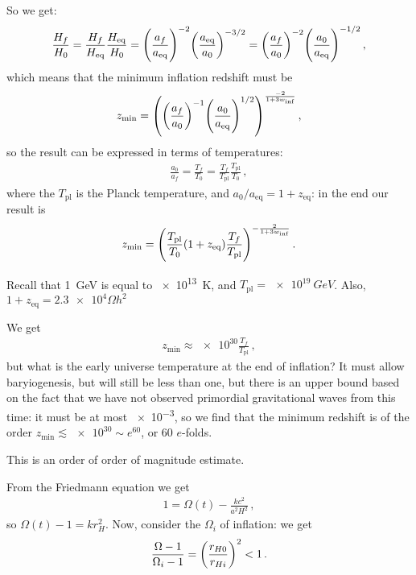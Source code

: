 \documentclass[main.tex]{subfiles}
\begin{document}
So we get: 
%
\begin{align}
  \frac{H_f}{H_0} 
  = \frac{H_f}{H _{\text{eq}}} \frac{H _{\text{eq}}}{H_0 } 
  = \qty(\frac{a_f}{a _{\text{eq}}})^{-2} \qty(\frac{a _{\text{eq}}}{a_0 })^{-3/2} 
  = \qty(\frac{a_f}{a_0 })^{-2} \qty(\frac{a_0}{a _{\text{eq}}})^{-1/2}
\,,
\end{align}
%
which means that the minimum inflation redshift must be 
%
\begin{align}
  z _{\text{min}} = \qty(\qty(\frac{a_f}{a_0 })^{-1} \qty(\frac{a_0 }{a _{\text{eq}}})^{1/2} )^{\frac{-2}{1 + 3 w _{\text{inf}}}}
\,,
\end{align}
%
so the result can be expressed in terms of temperatures: 
%
\begin{align}
  \frac{a_0}{a_f} = \frac{T_f}{T_0 } = \frac{T_f}{T _{\text{pl}}} \frac{T _{\text{pl}}}{T_0 }  
\,,
\end{align}
%
where the \(T _{\text{pl}}\) is the Planck temperature,
and \(a_0 / a _{\text{eq}} = 1 + z _{\text{eq}}\): in the end our result is 
%
\begin{align}
  z _{\text{min}} = \qty(\frac{T _{\text{pl}}}{T_0 } (1+ z _{\text{eq}}) \frac{T_f}{T _{\text{pl}}})^{- \frac{2}{1 + 3 w _{\text{inf}}}}
\,.
\end{align}
%

Recall that \SI{1}{GeV} is equal to \SI{e13}{K}, and \(T _{\text{pl}} = \SI{e19}{GeV}\).
Also, \(1 + z _{\text{eq}} = \num{2.3e4} \Omega h^2\) 


We get 
%
\begin{align}
  z _{\text{min}} \approx \num{e30} \frac{T_f}{T _{\text{pl}}}
\,,
\end{align}
%
but what is the early universe temperature at the end of inflation? It must allow baryiogenesis, but will still be less than one, but there is an upper bound based on the fact that we have not observed primordial gravitational waves from this time: it must be at most \num{e-3}, so we find that the minimum redshift is of the order \(z _{\text{min}} \lesssim \num{e30} \sim e^{60}\), or 60 \(e\)-folds.

This is an order of order of magnitude estimate.

From the Friedmann equation we get 
%
\begin{align}
  1 = \Omega (t) - \frac{k c^2}{a^2H^2}
\,,
\end{align}
%
so \(\Omega (t) - 1 = k r_H^2\). Now, consider the \(\Omega_i\) of inflation: we get 
%
\begin{align}
  \frac{\Omega -1}{\Omega_i -1} = \qty(\frac{r_{H0}}{r_{Hi}})^2 < 1 
\,.
\end{align}
\end{document}
